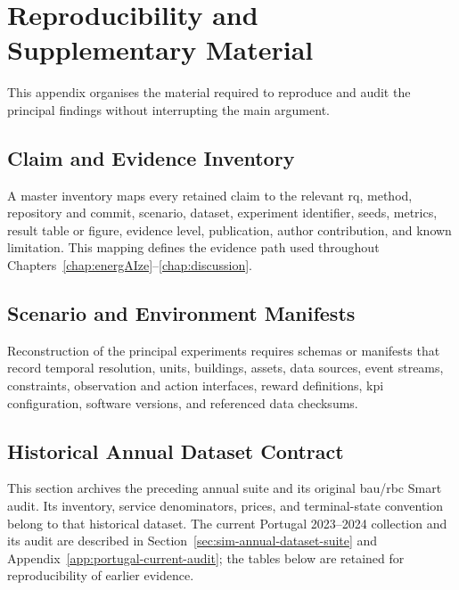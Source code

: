 \chapter{Reproducibility and Supplementary Material}
\label{app:reproducibility}

This appendix organises the material required to reproduce and audit the principal findings without interrupting the main argument.

\section{Claim and Evidence Inventory}

A master inventory maps every retained claim to the relevant \gls{rq}, method, repository and commit, scenario, dataset, experiment identifier, seeds, metrics, result table or figure, evidence level, publication, author contribution, and known limitation. This mapping defines the evidence path used throughout Chapters~\ref{chap:energAIze}--\ref{chap:discussion}.

\section{Scenario and Environment Manifests}

Reconstruction of the principal experiments requires schemas or manifests that record temporal resolution, units, buildings, assets, data sources, event streams, constraints, observation and action interfaces, reward definitions, \gls{kpi} configuration, software versions, and referenced data checksums.



\section{Historical Annual Dataset Contract}
\label{app:annual-suite-contract}

This section archives the preceding annual suite and its original \gls{bau}/\gls{rbc} Smart audit. Its inventory, service denominators, prices, and terminal-state convention belong to that historical dataset. The current Portugal 2023--2024 collection and its audit are described in Section~\ref{sec:sim-annual-dataset-suite} and Appendix~\ref{app:portugal-current-audit}; the tables below are retained for reproducibility of earlier evidence.



